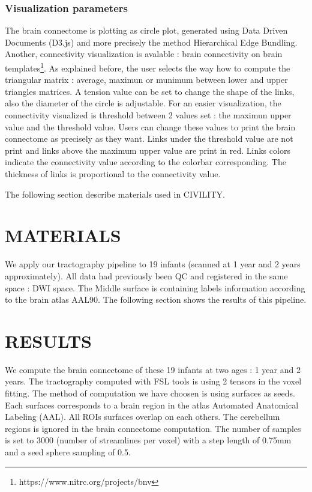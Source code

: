 \documentclass[]{spie}  %
\begin{document}
\subsubsection{Visualization parameters}

The brain connectome is plotting as circle plot, generated using Data Driven Documents (D3.js) and more precisely the method Hierarchical Edge Bundling. Another, connectivity visualization is avalable : brain connectivity on brain templates\footnote{https://www.nitrc.org/projects/bnv}.
As explained before, the user selects the way how to compute the triangular matrix : average, maximun or munimum between lower and upper triangles matrices. 
A tension value can be set to change the shape of the links, also the diameter of the circle is adjustable.
For an easier visualization, the connectivity visualized is threshold between 2 values set : the maximun upper value and the threshold value. Users can change these values to print the brain connectome as precisely as they want. Links under the threshold value are not print and links above the maximum upper value are print in red. 
Links colors  indicate the connectivity value according to the colorbar corresponding. The thickness of links is proportional to the connectivity value.

The following section describe materials used in CIVILITY.

\section{MATERIALS}

We apply our tractography pipeline to 19 infants (scanned at 1 year and 2 years approximately).
All data had previously been QC and registered in the same space : DWI space. The Middle surface is containing labels information according to the brain atlas AAL90. 
The following section shows the results of this pipeline. 

\section{RESULTS} 

We compute the brain connectome of these 19 infants at two ages : 1 year and 2 years. The tractography computed with FSL tools is using 2 tensors in the voxel fitting. The method of computation we have choosen is using surfaces as seeds. Each surfaces corresponds to a brain region in the atlas Automated Anatomical Labeling (AAL). All ROIs surfaces overlap on each others. The cerebellum regions is ignored in the brain connectome computation. The number of samples is set to 3000 (number of streamlines per voxel) with a step length of 0.75mm and a seed sphere sampling of 0.5. 
\end{document}
